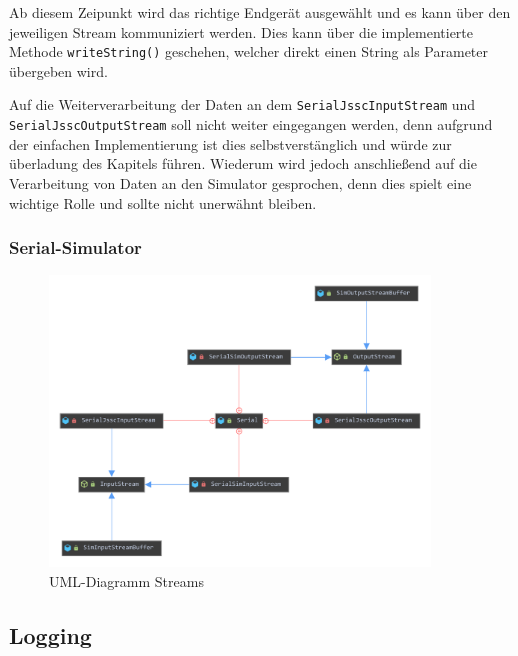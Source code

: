 Ab diesem Zeipunkt wird das richtige Endgerät ausgewählt und es kann über den jeweiligen Stream kommuniziert werden.
Dies kann über die implementierte Methode \lstinline[style=java]{writeString()} geschehen, welcher direkt einen String als Parameter übergeben wird.

Auf die Weiterverarbeitung der Daten an dem \lstinline[style=java]{SerialJsscInputStream} und \lstinline[style=java]{SerialJsscOutputStream} soll nicht weiter eingegangen werden, denn aufgrund der einfachen Implementierung ist dies selbstverstänglich und würde zur überladung des Kapitels führen.
Wiederum wird jedoch anschließend auf die Verarbeitung von Daten an den Simulator gesprochen, denn dies spielt eine wichtige Rolle und sollte nicht unerwähnt bleiben.
\subsubsection{Serial-Simulator}\label{sssec:serialSim}
\begin{figure}[H]
\centering
\includegraphics[width=0.9\textwidth]{fig/ainf/InputOutputStreams.pdf}
\caption{UML-Diagramm Streams}
\label{ProducerConsumer}
\end{figure}
\subsection{Logging}
